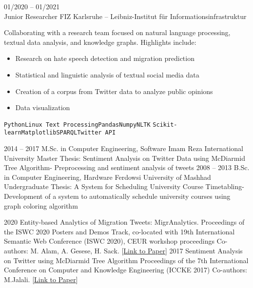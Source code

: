 \documentclass[9pt]{developercv} %
\begin{document}
\begin{entrylist}
{        }
    	\entry
    		{01/2020 -- 01/2021\\}
    		{Junior Researcher}
    		{FIZ Karlsruhe – Leibniz-Institut für Informationsinfrastruktur}
    		{Collaborating with a research team focused on natural language processing, textual data analysis, and knowledge graphs. Highlights include:
            \begin{itemize}
                \item Research on hate speech detection and migration prediction
                \item Statistical and linguistic analysis of textual social media data
                \item Creation of a corpus from Twitter data to analyze public opinions
                \item Data visualization
            \end{itemize}
            \texttt{Python}\slashsep\texttt{Linux Text Processing}\slashsep\texttt{Pandas}\slashsep\texttt{Numpy}\slashsep\texttt{NLTK}\slashsep
            \texttt{Scikit-learn}\slashsep\texttt{Matplotlib}\slashsep\texttt{SPARQL}\slashsep\texttt{Twitter API}
            }
    \end{entrylist}


    \pagebreak
	\begin{entrylist}
		\entry
		{2014 – 2017}
		{M.Sc. in Computer Engineering, Software}
		{Imam Reza International University}
		{Master Thesis: Sentiment Analysis on Twitter Data using McDiarmid Tree Algorithm- Preprocessing and sentiment analysis of tweets}
		\entry
		{2008 – 2013}
		{B.Sc. in Computer Engineering, Hardware}
		{Ferdowsi University of Mashhad}
		{Undergraduate Thesis: A System for Scheduling University Course Timetabling- Development of a system to automatically schedule university courses using graph coloring algorithm}
	\end{entrylist}

	\cvsect{Publications}
    \begin{entrylist}
        \entry
        {2020}
        {Entity-based Analytics of Migration Tweets: MigrAnalytics.}
        {Proceedings of the ISWC 2020 Posters and Demos Track, co-located with 19th International Semantic Web Conference (ISWC 2020), CEUR workshop proceedings}
        {Co-authors: M. Alam, A. Gesese, H. Sack. [\href{https://ceur-ws.org/Vol-2721/paper514.pdf}{Link to Paper}]}
        \entry
        {2017}
        {Sentiment Analysis on Twitter using McDiarmid Tree Algorithm}
        {Proceedings of the 7th International Conference on Computer and Knowledge Engineering (ICCKE 2017)}
        {Co-authors: M.Jalali. [\href{https://ieeexplore.ieee.org/document/8167924}{Link to Paper}]}
    \end{entrylist}
\end{document}

